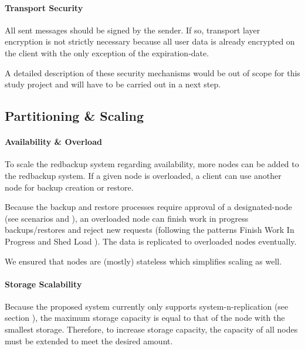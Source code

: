 \paragraph{Transport Security} All sent \glspl{message} should be signed by the sender. If so, transport layer encryption is not strictly necessary because all user data is already encrypted on the \gls{client} with the only exception of the \gls{expiration-date}.
\\
\vspace{1em}

\noindent A detailed description of these security mechanisms would be out of scope for this study project and will have to be carried out in a next step.

\subsection{Partitioning \& Scaling}

\paragraph{Availability \& Overload} To scale the redbackup system regarding availability, more \glspl{node} can be added to the redbackup system. If a given \gls{node} is overloaded, a \gls{client} can use another \gls{node} for backup creation or restore.

Because the backup and restore processes require approval of a \gls{designated-node} (see scenarios  and ), an overloaded \gls{node} can finish work in progress backups/restores and reject new requests (following the patterns Finish Work In Progress and Shed Load \cite{fault-tolerance}). The data is replicated to overloaded \glspl{node} eventually.

We ensured that \glspl{node} are (mostly) stateless which simplifies scaling as well.

\paragraph{Storage Scalability} Because the proposed system currently only supports \gls{system-n-replication} (see section ), the maximum storage capacity is equal to that of the \gls{node} with the smallest storage. Therefore, to increase storage capacity, the capacity of all \glspl{node} must be extended to meet the desired amount.

